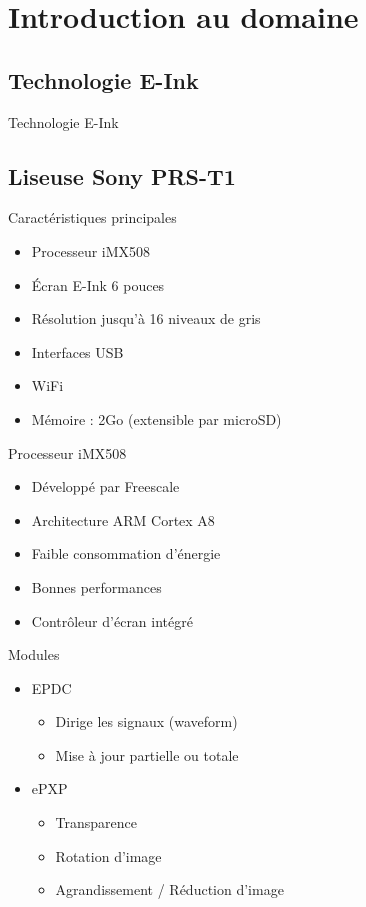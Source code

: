 \section[Intruduction]{Introduction au domaine}


\subsection[E-Ink]{Technologie E-Ink}
\begin{frame}{Technologie E-Ink}
\end{frame}


\subsection[Sony PRS-T1]{Liseuse Sony PRS-T1}
\begin{frame}{Caractéristiques principales} %
		\begin{itemize}
			\item Processeur iMX508
			\item Écran E-Ink 6 pouces
			\item Résolution jusqu'à 16 niveaux de gris
			\item Interfaces USB
			\item WiFi
			\item Mémoire : 2Go (extensible par microSD)
		\end{itemize}
\end{frame}

\begin{frame}{Processeur iMX508} %
	\begin{itemize}
		\item{Développé par Freescale}
		\item{Architecture ARM Cortex A8}
		\item{Faible consommation d'énergie}
		\item{Bonnes performances}
		\item{Contrôleur d'écran intégré}
		
	\end{itemize}
\end{frame}

\begin{frame}{Modules}
	\begin{itemize}
		\item{EPDC}
		\begin{itemize}
			\item{Dirige les signaux (waveform)}
			\item{Mise à jour partielle ou totale}
		\end{itemize}
		\item{ePXP}
		\begin{itemize}
			\item Transparence
			\item Rotation d'image
			\item Agrandissement / Réduction d'image
		\end{itemize}
	\end{itemize}
\end{frame}

